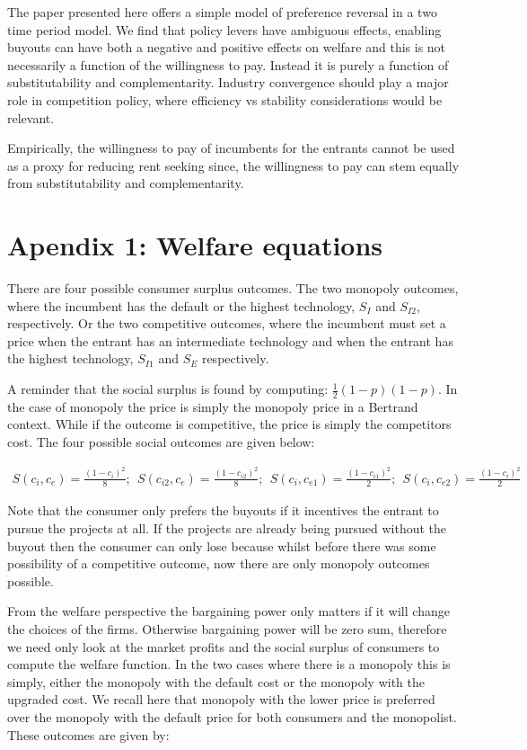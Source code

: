\documentclass[11pt]{article}
\begin{document}
The paper presented here offers a simple model of preference reversal in a two time period model. We find that policy levers have ambiguous effects, enabling buyouts can have both a negative and positive effects on welfare and this is not necessarily a function of the willingness to pay. Instead it is purely a function of substitutability and complementarity. Industry convergence should play a major role in competition policy, where efficiency vs stability considerations would be relevant. 

Empirically, the willingness to pay of incumbents for the entrants cannot be used as a proxy for reducing rent seeking since, the willingness to pay can stem equally from substitutability and complementarity. 


\newpage
\section*{Apendix 1: Welfare equations}

There are four possible consumer surplus outcomes. The two monopoly outcomes, where the incumbent has the default or the highest technology, $S_I$ and $S_{I2}$, respectively. Or the two competitive outcomes, where the incumbent must set a price when the entrant has an intermediate technology and when the entrant has the highest technology, $S_{I1}$ and $S_{E}$ respectively. 

A reminder that the social surplus is found by computing:
$\frac{1}{2}(1- p)(1-p)$. In the case of monopoly the price is simply the monopoly price in a Bertrand context. While if the outcome is competitive, the price is simply the competitors cost. The four possible  social outcomes are given below:

\begin{align*}
S(c_i, c_e) =  \frac{(1-c_i)^2}{8};  ~~
S(c_{i2}, c_e)=  \frac{(1-c_{i2})^2}{8}; ~~
S(c_{i}, c_{e1}) = \frac{(1-c_{i1})^2}{2};~~
S(c_{i}, c_{e2}) =  \frac{(1-c_i)^2}{2}
\end{align*}

Note that the consumer only prefers the buyouts if it incentives the entrant to pursue the projects at all. If the projects are already being pursued without the buyout then the consumer can only lose because whilst before there was some possibility of a competitive outcome, now there are only monopoly outcomes possible. 

From the welfare perspective the bargaining power only matters if it will change the choices of the firms. Otherwise bargaining power will be zero sum, therefore we need only look at the market profits and the social surplus of consumers to compute the welfare function. In the two cases where there is a monopoly this is simply, either the monopoly with the default cost or the monopoly with the upgraded cost. We recall here that monopoly with the lower price is preferred over the monopoly with the default price for both consumers and the monopolist. These outcomes are given by:
\end{document}
